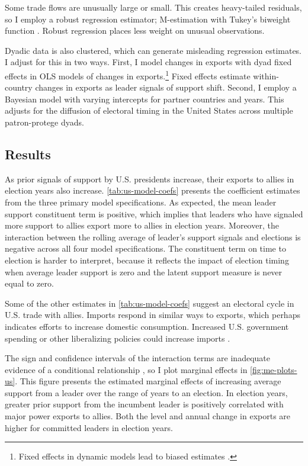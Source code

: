 \documentclass[12pt]{article}
\begin{document}
Some trade flows are unusually large or small. 
This creates heavy-tailed residuals, so I employ a robust regression estimator; M-estimation with Tukey's biweight function \citep{RaineyBaissa2020}.
Robust regression places less weight on unusual observations. 


Dyadic data is also clustered, which can generate misleading regression estimates.
I adjust for this in two ways. 
First, I model changes in exports with dyad fixed effects in OLS models of changes in exports.\footnote{Fixed effects in dynamic models lead to biased estimates \citep{Nickell1981}.}
Fixed effects estimate within-country changes in exports as leader signals of support shift.
Second, I employ a Bayesian model with varying intercepts for partner countries and years. 
This adjusts for the diffusion of electoral timing in the United States across multiple patron-protege dyads.




\subsection{Results}


As prior signals of support by U.S. presidents increase, their exports to allies in election years also increase. 
\autoref{tab:us-model-coefs} presents the coefficient estimates from the three primary model specifications.
As expected, the mean leader support constituent term is positive, which implies that leaders who have signaled more support to allies export more to allies in election years. 
Moreover, the interaction between the rolling average of leader's support signals and elections is negative across all four model specifications.
The constituent term on time to election is harder to interpret, because it reflects the impact of election timing when average leader support is zero and the latent support measure is never equal to zero. 





Some of the other estimates in \autoref{tab:us-model-coefs} suggest an electoral cycle in U.S. trade with allies.
Imports respond in similar ways to exports, which perhaps indicates efforts to increase domestic consumption.
Increased U.S. government spending or other liberalizing policies could increase imports \citep{Oatley2015}.


The sign and confidence intervals of the interaction terms are inadequate evidence of a conditional relationship \citep{BramborClarkGolder2006}, so I plot marginal effects in \autoref{fig:me-plots-us}.
This figure presents the estimated marginal effects of increasing average support from a leader over the range of years to an election.
In election years, greater prior support from the incumbent leader is positively correlated with major power exports to allies. 
Both the level and annual change in exports are higher for committed leaders in election years.
\end{document}
